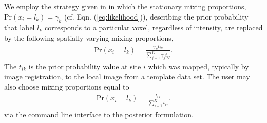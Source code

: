 \documentclass[11pt,english]{article}
\begin{document}
We employ the strategy given in \cite{Ashburner2005} in which the
stationary mixing proportions, $\mathrm{Pr}(x_i = l_k) = \gamma_k$
(cf. Eqn. (\ref{eq:likelihood})), 
describing the prior probability that label $l_k$ corresponds to a particular voxel, regardless of intensity, are replaced by the following spatially varying mixing proportions,
\begin{align}
\mathrm{Pr}(x_i = l_k) = \frac{\gamma_k t_{ik}}{\sum_{j=1}^K\gamma_j t_{ij}}.
\end{align}
The $t_{ik}$ is the prior probability value at site $i$ which was
mapped, typically by image registration, to the local image
from a template data set.  The user may also
choose mixing proportions equal to
\begin{align}
\mathrm{Pr}(x_i = l_k) = \frac{t_{ik}}{\sum_{j=1}^K t_{ij}}.
\end{align}
via the command line interface to the posterior formulation.
\end{document}
